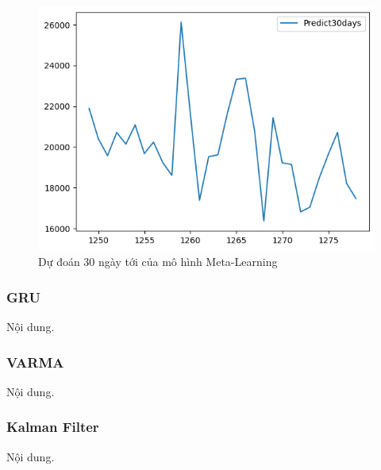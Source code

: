 \begin{figure}[H]
\begin{minipage}{0.15\textwidth}
    \includegraphics[width=1\textwidth]{resources/chapter-5/predicted/EXB_ML_9_1_next30days.png}
    \end{minipage}
    \hfill
    
    \caption{Dự đoán 30 ngày tới của mô hình Meta-Learning}
    \label{fig:ml_predicted}
\end{figure}




\subsubsection{GRU}
Nội dung.




\subsubsection{VARMA}
Nội dung.




\subsubsection{Kalman Filter}
Nội dung.





